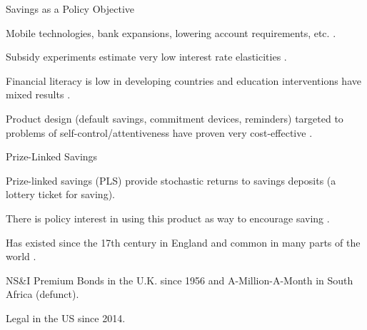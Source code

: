 \documentclass[aspectratio=169]{beamer}
\newenvironment{wideitemize}{\itemize\addtolength{\itemsep}{10pt}}{\enditemize}
\newenvironment{wideenumerate}{\enumerate\addtolength{\itemsep}{10pt}}{\endenumerate}
\begin{document}
\begin{frame}{Savings as a Policy Objective}

	\begin{wideenumerate}



		\item Mobile technologies, bank expansions, lowering account requirements, etc. \parencite{jack_mobile_2011,dupas_challenges_2014,dupas_savings_2009,burgess_rural_2005}.

		
		\item Subsidy experiments estimate very low interest rate elasticities \parencite{karlan_price_2018,schaner_persistent_2018}.
		
		\item Financial literacy is low in developing countries and education interventions have mixed results \parencite{miller_can_2015}.
		
		\item Product design (default savings, commitment devices, reminders) targeted to problems of self-control/attentiveness have proven very cost-effective \parencite{ashraf_tying_2006,dupas_why_2013,somville_saving_2018}.

	\end{wideenumerate}

\end{frame}

\begin{frame}{Prize-Linked Savings}

	Prize-linked savings (PLS) provide stochastic returns to savings deposits (a lottery ticket for saving).

	\begin{wideitemize}
		\item There is policy interest in using this product as way to encourage saving \parencite{kearney_making_2010}.
		\item Has existed since the 17th century in England and common in many parts of the world \parencite{kearney_making_2010}.
		\item NS\&I Premium Bonds in the U.K. since 1956 and A-Million-A-Month in South Africa (defunct).
		\item Legal in the US since 2014.
	\end{wideitemize}

\end{frame}
\end{document}
